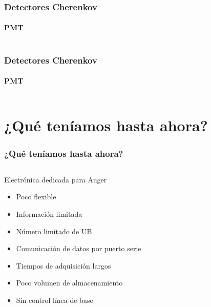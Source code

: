 \documentclass{beamer}
\begin{document}
\begin{frame}
	\frametitle{Detectores Cherenkov}
	\framesubtitle{PMT}
\begin{columns}
	\begin{column}{0.50\textwidth}
	\end{column} 
 	\begin{column}{0.50\textwidth}
 \end{column}
\end{columns}
\end{frame} 

\begin{frame}
	\frametitle{Detectores Cherenkov}
	\framesubtitle{PMT}
\begin{columns}
	\begin{column}{0.50\textwidth}
	\end{column} 
 	\begin{column}{0.50\textwidth}
 \end{column}
\end{columns}
\end{frame} 

\section[Lo que teníamos]{¿Qué teníamos hasta ahora?}
\begin{frame}
	\frametitle{¿Qué teníamos hasta ahora?}

\begin{columns}
	\begin{column}{0.40\textwidth}
		\begin{block}{Electrónica dedicada para Auger}
    	\begin{itemize}[<+->]
      	\item Poco flexible 
      	\item Información limitada
      	\item Número limitado de UB 
				\item Comunicación de datos por puerto serie
				\item	Tiempos de adquisición largos
				\item	Poco volumen de almacenamiento
				\item Sin control línea de base	
    	\end{itemize}
		\end{block}
	\end{column} 
 	\begin{column}{0.55\textwidth}
 \end{column}
\end{columns}
\end{frame} 
\end{document}
